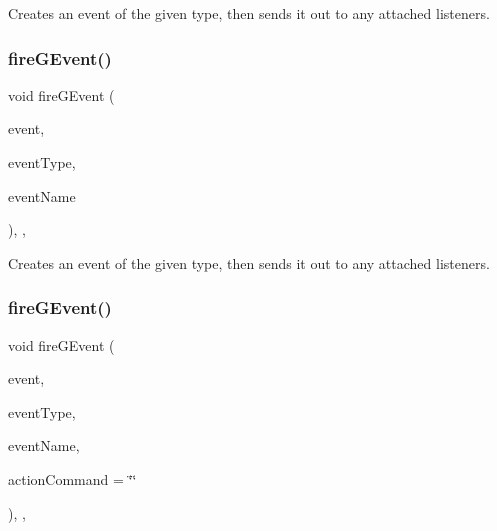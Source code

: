 Creates an event of the given type, then sends it out to any attached listeners. 

\mbox{\label{classGObservable_abb0b2f66ba39211cb5d7615e9d1c04e2}} 
\subsubsection{\texorpdfstring{fire\+G\+Event()}{fireGEvent()}\hspace{0.1cm}{\footnotesize\ttfamily [3/8]}}
{\footnotesize\ttfamily void fire\+G\+Event (\begin{DoxyParamCaption}\item[{Q\+Key\+Event $\ast$}]{event,  }\item[{Event\+Type}]{event\+Type,  }\item[{const std\+::string \&}]{event\+Name }\end{DoxyParamCaption})\hspace{0.3cm}{\ttfamily [protected]}, {\ttfamily [virtual]}, {\ttfamily [inherited]}}



Creates an event of the given type, then sends it out to any attached listeners. 

\mbox{\label{classGObservable_a119318675d2165bdf7dd853aaf881d4b}} 
\subsubsection{\texorpdfstring{fire\+G\+Event()}{fireGEvent()}\hspace{0.1cm}{\footnotesize\ttfamily [4/8]}}
{\footnotesize\ttfamily void fire\+G\+Event (\begin{DoxyParamCaption}\item[{Q\+Mouse\+Event $\ast$}]{event,  }\item[{Event\+Type}]{event\+Type,  }\item[{const std\+::string \&}]{event\+Name,  }\item[{const std\+::string \&}]{action\+Command = {\ttfamily \char`\"{}\char`\"{}} }\end{DoxyParamCaption})\hspace{0.3cm}{\ttfamily [protected]}, {\ttfamily [virtual]}, {\ttfamily [inherited]}}



